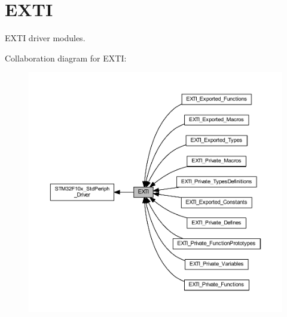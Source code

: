 \hypertarget{group___e_x_t_i}{}\section{E\+X\+TI}
\label{group___e_x_t_i}


E\+X\+TI driver modules.  


Collaboration diagram for E\+X\+TI\+:
\nopagebreak
\begin{figure}[H]
\begin{center}
\leavevmode
\includegraphics[width=350pt]{group___e_x_t_i}
\end{center}
\end{figure}
